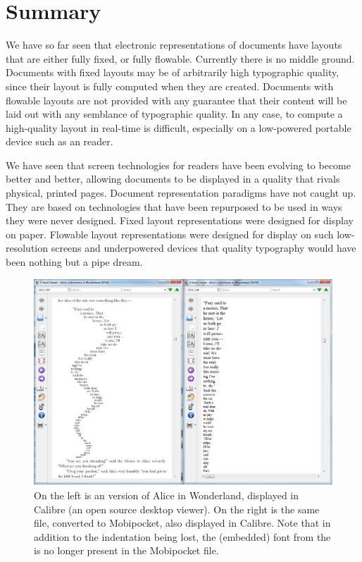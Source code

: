 \section{Summary}

We have so far seen that electronic representations of documents have layouts that are either fully fixed, or fully flowable. Currently there is no middle ground. Documents with fixed layouts may be of arbitrarily high typographic quality, since their layout is fully computed when they are created. Documents with flowable layouts are not provided with any guarantee that their content will be laid out with any semblance of typographic quality. In any case, to compute a high-quality layout in real-time is difficult, especially on a low-powered portable device such as an \ebook{} reader.

We have seen that screen technologies for \ebook{} readers have been evolving to become better and better, allowing documents to be displayed in a quality that rivals physical, printed pages. Document representation paradigms have not caught up. They are based on technologies that have been repurposed to be used in ways they were never designed. Fixed layout representations were designed for display on paper. Flowable layout representations were designed for display on such low-resolution screens and underpowered devices that quality typography would have been nothing but a pipe dream.


\begin{figure}
\includegraphics[width=\textwidth]{gfx/alices1}
\caption[Document displayed in Calibre]{On the left is an \epub{} version of Alice in Wonderland, displayed in Calibre (an open source desktop \ebook{} viewer). On the right is the same file, converted to Mobipocket, also displayed in Calibre. Note that in addition to the indentation being lost, the (embedded) font from the \epub{} is no longer present in the Mobipocket file.}
\label{fig:alices1}
\end{figure}




